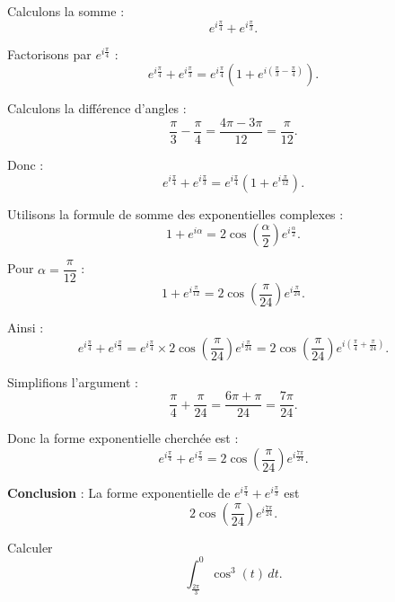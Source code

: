 \documentclass[a4paper,12pt]{article}
\begin{document}
\begin{solutionbox}
Calculons la somme :
\[
e^{i\frac{\pi}{4}} + e^{i\frac{\pi}{3}}.
\]

Factorisons par \( e^{i\frac{\pi}{4}} \) :
\[
e^{i\frac{\pi}{4}} + e^{i\frac{\pi}{3}} = e^{i\frac{\pi}{4}} \left(1 + e^{i\left(\frac{\pi}{3} - \frac{\pi}{4}\right)}\right).
\]

Calculons la différence d'angles :
\[
\frac{\pi}{3} - \frac{\pi}{4} = \frac{4\pi - 3\pi}{12} = \frac{\pi}{12}.
\]

Donc :
\[
e^{i\frac{\pi}{4}} + e^{i\frac{\pi}{3}} = e^{i\frac{\pi}{4}} \left(1 + e^{i\frac{\pi}{12}}\right).
\]

Utilisons la formule de somme des exponentielles complexes :
\[
1 + e^{i\alpha} = 2\cos\left(\dfrac{\alpha}{2}\right)e^{i\frac{\alpha}{2}}.
\]

Pour \( \alpha = \dfrac{\pi}{12} \) :
\[
1 + e^{i\frac{\pi}{12}} = 2\cos\left(\dfrac{\pi}{24}\right)e^{i\frac{\pi}{24}}.
\]

Ainsi :
\[
e^{i\frac{\pi}{4}} + e^{i\frac{\pi}{3}} = e^{i\frac{\pi}{4}} \times 2\cos\left(\dfrac{\pi}{24}\right) e^{i\frac{\pi}{24}} = 2\cos\left(\dfrac{\pi}{24}\right) e^{i\left(\frac{\pi}{4} + \frac{\pi}{24}\right)}.
\]

Simplifions l'argument :
\[
\frac{\pi}{4} + \frac{\pi}{24} = \frac{6\pi + \pi}{24} = \frac{7\pi}{24}.
\]

Donc la forme exponentielle cherchée est :
\[
e^{i\frac{\pi}{4}} + e^{i\frac{\pi}{3}} = 2\cos\left(\dfrac{\pi}{24}\right) e^{i\frac{7\pi}{24}}.
\]

\textbf{Conclusion} : La forme exponentielle de \( e^{i\frac{\pi}{4}} + e^{i\frac{\pi}{3}} \) est
\[
2\cos\left(\dfrac{\pi}{24}\right) e^{i\frac{7\pi}{24}}.
\]
\end{solutionbox}

\begin{tcolorbox}[title=Exercice 5 - {[}Calculer{]}]
Calculer
\[
\int_{\frac{2\pi}{3}}^{0} \cos^3(t) \, dt.
\]
\end{tcolorbox}
\end{document}
